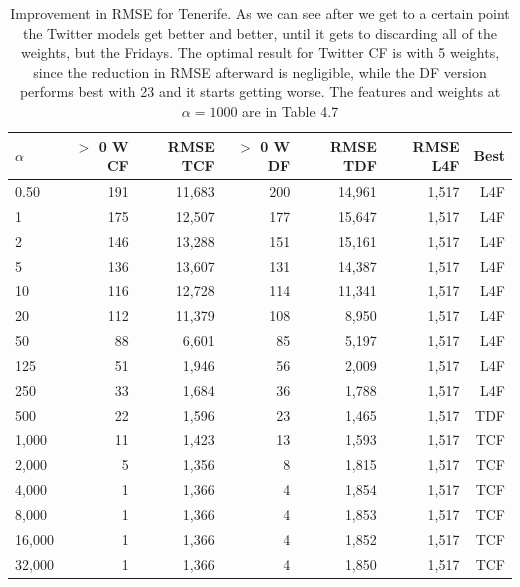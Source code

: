 \documentclass[minf,frontabs,twoside,singlespacing,parskip]{infthesis}
\begin{document}
\begin{table}[h]
\begin{center}
\begin{tabular}{ l | r | r | r | r | r | r}
$\alpha$ & $>$ 0 W CF & RMSE TCF & $>$ 0 W DF & RMSE TDF & RMSE L4F & Best\\
\hline
0.50 & 191 & 11,683 & 200 & 14,961 & 1,517 & L4F\\
1 & 175 & 12,507 & 177 & 15,647 & 1,517 & L4F\\
2 & 146 & 13,288 & 151 & 15,161 & 1,517 & L4F\\
5 & 136 & 13,607 & 131 & 14,387 & 1,517 & L4F\\
10 & 116 & 12,728 & 114 & 11,341 & 1,517 & L4F\\
20 & 112 & 11,379 & 108 & 8,950 & 1,517 & L4F\\
50 & 88 & 6,601 & 85 & 5,197 & 1,517 & L4F\\
125 & 51 & 1,946 & 56 & 2,009 & 1,517 & L4F\\
250 & 33 & 1,684 & 36 & 1,788 & 1,517 & L4F\\
\hline
500 & 22 & 1,596 & 23 & 1,465 & 1,517 & TDF\\
1,000 & 11 & 1,423 & 13 & 1,593 & 1,517 & TCF\\
2,000 & 5 & 1,356 & 8 & 1,815 & 1,517 & TCF\\
4,000 & 1 & 1,366 & 4 & 1,854 & 1,517 & TCF\\
8,000 & 1 & 1,366 & 4 & 1,853 & 1,517 & TCF\\
16,000 & 1 & 1,366 & 4 & 1,852 & 1,517 & TCF\\
32,000 & 1 & 1,366 & 4 & 1,850 & 1,517 & TCF\\
\end{tabular}
\end{center}
\caption{Improvement in RMSE for Tenerife. As we can see after we get to a certain point the Twitter models get better and better, until it gets to discarding all of the weights, but the Fridays. The optimal result for Twitter CF is with 5 weights, since the reduction in RMSE afterward is negligible, while the DF version performs best with 23 and it starts getting worse. The features and weights at $\alpha = 1000$ are in Table 4.7}
\label{table-tenerife}
\end{table}
\end{document}
